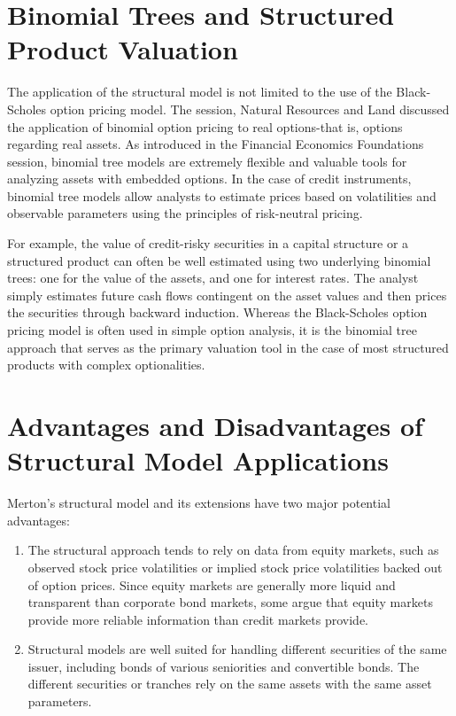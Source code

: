 \documentclass[11pt]{article}
\begin{document}
\section*{Binomial Trees and Structured Product Valuation}
The application of the structural model is not limited to the use of the Black-Scholes option pricing model. The session, Natural Resources and Land discussed the application of binomial option pricing to real options-that is, options regarding real assets. As introduced in the Financial Economics Foundations session, binomial tree models are extremely flexible and valuable tools for analyzing assets with embedded options. In the case of credit instruments, binomial tree models allow analysts to estimate prices based on volatilities and observable parameters using the principles of risk-neutral pricing.

For example, the value of credit-risky securities in a capital structure or a structured product can often be well estimated using two underlying binomial trees: one for the value of the assets, and one for interest rates. The analyst simply estimates future cash flows contingent on the asset values and then prices the securities through backward induction. Whereas the Black-Scholes option pricing model is often used in simple option analysis, it is the binomial tree approach that serves as the primary valuation tool in the case of most structured products with complex optionalities.

\section*{Advantages and Disadvantages of Structural Model Applications}
Merton's structural model and its extensions have two major potential advantages:

\begin{enumerate}
  \item The structural approach tends to rely on data from equity markets, such as observed stock price volatilities or implied stock price volatilities backed out of option prices. Since equity markets are generally more liquid and transparent than corporate bond markets, some argue that equity markets provide more reliable information than credit markets provide.

  \item Structural models are well suited for handling different securities of the same issuer, including bonds of various seniorities and convertible bonds. The different securities or tranches rely on the same assets with the same asset parameters.

\end{enumerate}
\end{document}
